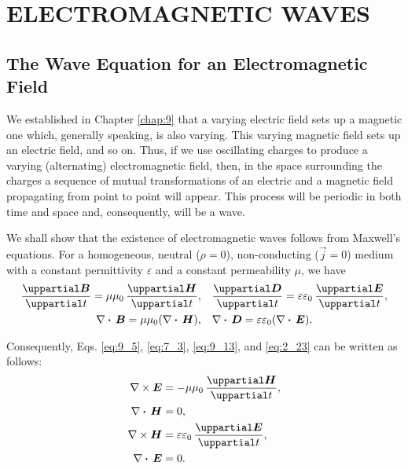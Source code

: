 

\chapter[ELECTROMAGNETIC WAVES]{ELECTROMAGNETIC WAVES}\label{chap:15}

\section{The Wave Equation for
an Electromagnetic Field}\label{sec:15_1}

We established in Chapter \ref{chap:9} that a varying electric field sets up a magnetic one which, generally speaking, is also varying.
This varying magnetic field sets up an electric field, and so on.
Thus, if we use oscillating charges to produce a varying (alternating) electromagnetic field, then, in the space surrounding the charges a sequence of mutual transformations of an electric and a magnetic field propagating from point to point will appear.
This process will be periodic in both time and space and, consequently, will be a wave.

We shall show that the existence of electromagnetic waves follows from Maxwell's equations.
For a homogeneous, neutral ($\rho=0$), non-conducting ($\vec{j}=0$) medium with a constant permittivity $\varepsilon$ and a constant permeability $\mu$, we have
\begin{align*}
    \diffpartial{\vec{B}}{t} = \mu\mu_0\, \diffpartial{\vec{H}}{t},&\quad \diffpartial{\vec{D}}{t} = \varepsilon\varepsilon_0\, \diffpartial{\vec{E}}{t},\\
    \divop{\vec{B}} = \mu\mu_0 (\divop{\vec{H}}),&\quad \divop{\vec{D}} = \varepsilon\varepsilon_0 (\divop{\vec{E}}).
\end{align*}

\noindent
Consequently, Eqs. \eqref{eq:9_5}, \eqref{eq:7_3}, \eqref{eq:9_13}, and \eqref{eq:2_23} can be written as
follows:
\begin{align}
    \curlop{\vec{E}} &= - \mu\mu_0\, \diffpartial{\vec{H}}{t}, \label{eq:15_1}\\
    \divop{\vec{H}} &= 0, \label{eq:15_2}\\
    \curlop{\vec{H}} &= \varepsilon\varepsilon_0\, \diffpartial{\vec{E}}{t}, \label{eq:15_3}\\
    \divop{\vec{E}} &= 0. \label{eq:15_4}
\end{align}

